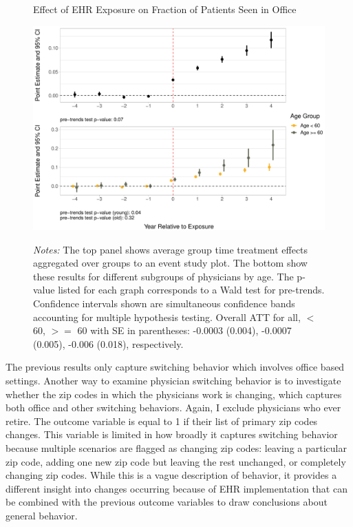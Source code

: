 \documentclass[12pt]{article}
\begin{document}
\begin{figure}[ht]
    \centering
    \captionsetup{width=.85\linewidth}
    \caption{Effect of EHR Exposure on Fraction of Patients Seen in Office}
    \includegraphics[scale=.6]{Objects/officefrac_plot.pdf}
    \label{fig:officesecond}
    \vspace{2mm}
    \caption*{\footnotesize{\textit{Notes:} The top panel shows average group time treatment effects aggregated over groups to an event study plot. The bottom show these results for different subgroups of physicians by age. The p-value listed for each graph corresponds to a Wald test for pre-trends. Confidence intervals shown are simultaneous confidence bands accounting for multiple hypothesis testing. Overall ATT for all, $<$ 60, $>=$ 60 with SE in parentheses: -0.0003 (0.004), -0.0007 (0.005), -0.006 (0.018), respectively.}}
\end{figure}

The previous results only capture switching behavior which involves office based settings. Another way to examine physician switching behavior is to investigate whether the zip codes in which the physicians work is changing, which captures both office and other switching behaviors. Again, I exclude physicians who ever retire. The outcome variable is equal to 1 if their list of primary zip codes changes. This variable is limited in how broadly it captures switching behavior because multiple scenarios are flagged as changing zip codes: leaving a particular zip code, adding one new zip code but leaving the rest unchanged, or completely changing zip codes. While this is a vague description of behavior, it provides a different insight into changes occurring because of EHR implementation that can be combined with the previous outcome variables to draw conclusions about general behavior.
\end{document}
